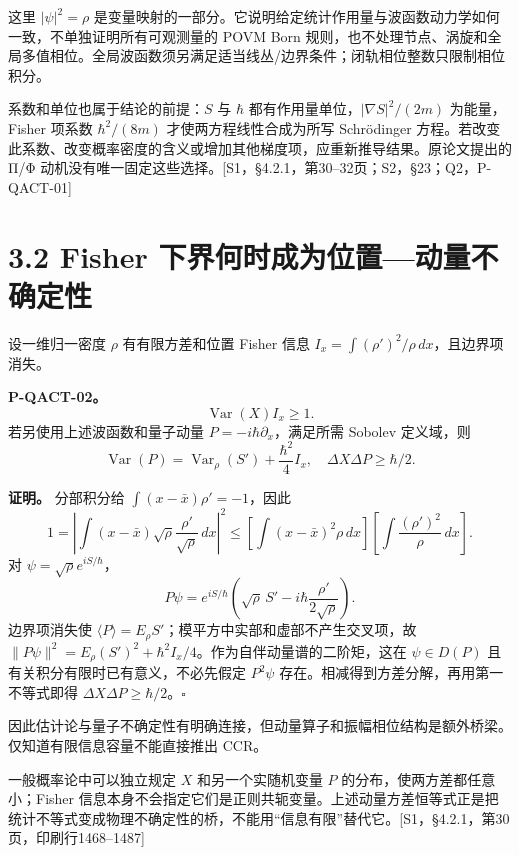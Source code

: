 \documentclass[
  11pt,
  oneside]{book}
\begin{document}
这里 \(|\psi|^2=\rho\)
是变量映射的一部分。它说明给定统计作用量与波函数动力学如何一致，不单独证明所有可观测量的
POVM Born
规则，也不处理节点、涡旋和全局多值相位。全局波函数须另满足适当线丛/边界条件；闭轨相位整数只限制相位积分。

系数和单位也属于结论的前提：\(S\) 与 \(\hbar\)
都有作用量单位，\(|\nabla S|^2/(2m)\) 为能量，Fisher 项系数
\(\hbar^2/(8m)\) 才使两方程线性合成为所写 Schrödinger
方程。若改变此系数、改变概率密度的含义或增加其他梯度项，应重新推导结果。原论文提出的
Π/Φ
动机没有唯一固定这些选择。{[}S1，§4.2.1，第30--32页；S2，§23；Q2，P-QACT-01{]}

\hypertarget{fisher-ux4e0bux754cux4f55ux65f6ux6210ux4e3aux4f4dux7f6eux52a8ux91cfux4e0dux786eux5b9aux6027}{%
\section{3.2 Fisher
下界何时成为位置---动量不确定性}\label{fisher-ux4e0bux754cux4f55ux65f6ux6210ux4e3aux4f4dux7f6eux52a8ux91cfux4e0dux786eux5b9aux6027}}

设一维归一密度 \(\rho\) 有有限方差和位置 Fisher 信息
\(I_x=\int(\rho')^2/\rho\,dx\)，且边界项消失。

\protect\hypertarget{p-qact-02}{}{}

\textbf{P-QACT-02。} \[
\operatorname{Var}(X)I_x\ge1.
\] 若另使用上述波函数和量子动量 \(P=-i\hbar\partial_x\)，满足所需
Sobolev 定义域，则 \[
\operatorname{Var}(P)=\operatorname{Var}_\rho(S')
+\frac{\hbar^2}{4}I_x,
\quad \Delta X\Delta P\ge\hbar/2.
\]

\textbf{证明。} 分部积分给 \(\int(x-\bar x)\rho'=-1\)，因此 \[
1=\left|\int(x-\bar x)\sqrt\rho\frac{\rho'}{\sqrt\rho}\,dx\right|^2
\le\left[\int(x-\bar x)^2\rho\,dx\right]
\left[\int\frac{(\rho')^2}{\rho}\,dx\right].
\] 对 \(\psi=\sqrt\rho e^{iS/\hbar}\)， \[
P\psi=e^{iS/\hbar}\left(\sqrt\rho\,S'-i\hbar\frac{\rho'}{2\sqrt\rho}\right).
\] 边界项消失使
\(\langle P\rangle=E_\rho S'\)；模平方中实部和虚部不产生交叉项，故
\(\|P\psi\|^2=E_\rho(S')^2+\hbar^2I_x/4\)。作为自伴动量谱的二阶矩，这在
\(\psi\in D(P)\) 且有关积分有限时已有意义，不必先假定 \(P^2\psi\)
存在。相减得到方差分解，再用第一不等式即得
\(\Delta X\Delta P\ge\hbar/2\)。\(\square\)

因此估计论与量子不确定性有明确连接，但动量算子和振幅相位结构是额外桥梁。仅知道有限信息容量不能直接推出
CCR。

一般概率论中可以独立规定 \(X\) 和另一个实随机变量 \(P\)
的分布，使两方差都任意小；Fisher
信息本身不会指定它们是正则共轭变量。上述动量方差恒等式正是把统计不等式变成物理不确定性的桥，不能用``信息有限''替代它。{[}S1，§4.2.1，第30页，印刷行1468--1487{]}
\end{document}
